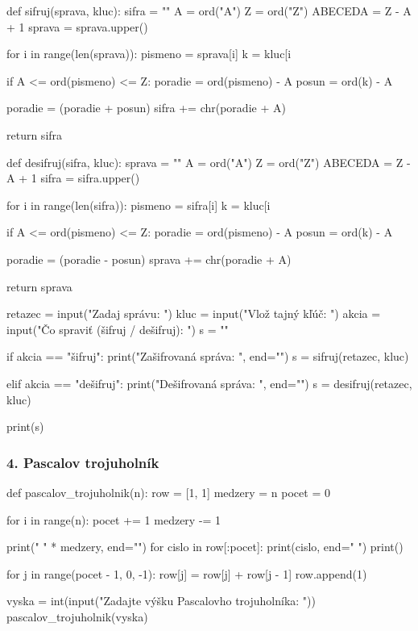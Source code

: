 \begin{solution}
def sifruj(sprava, kluc):
    sifra = ""
    A = ord("A")
    Z = ord("Z")
    ABECEDA = Z - A + 1
    sprava = sprava.upper()

    for i in range(len(sprava)):
        pismeno = sprava[i]
        k = kluc[i %

        if A <= ord(pismeno) <= Z:
            poradie = ord(pismeno) - A
            posun = ord(k) - A

            poradie = (poradie + posun) %
            sifra += chr(poradie + A)

    return sifra


def desifruj(sifra, kluc):
    sprava = ""
    A = ord("A")
    Z = ord("Z")
    ABECEDA = Z - A + 1
    sifra = sifra.upper()

    for i in range(len(sifra)):
        pismeno = sifra[i]
        k = kluc[i %

        if A <= ord(pismeno) <= Z:
            poradie = ord(pismeno) - A
            posun = ord(k) - A

            poradie = (poradie - posun) %
            sprava += chr(poradie + A)

    return sprava


retazec = input("Zadaj správu: ")
kluc = input("Vlož tajný kľúč: ")
akcia = input("Čo spraviť (šifruj / dešifruj): ")
s = ""

if akcia == "šifruj":
    print("Zašifrovaná správa: ", end="")
    s = sifruj(retazec, kluc)

elif akcia == "dešifruj":
    print("Dešifrovaná správa: ", end="")
    s = desifruj(retazec, kluc)

print(s)
\end{solution}


\subsubsection*{4. Pascalov trojuholník}

\begin{solution}
def pascalov_trojuholnik(n):
    row = [1, 1]
    medzery = n
    pocet = 0

    for i in range(n):
        pocet += 1
        medzery -= 1

        print(" " * medzery, end="")
        for cislo in row[:pocet]:
            print(cislo, end=" ")
        print()

        for j in range(pocet - 1,  0, -1):
            row[j] = row[j] + row[j - 1]
        row.append(1)


vyska = int(input("Zadajte výšku Pascalovho trojuholníka: "))
pascalov_trojuholnik(vyska)
\end{solution}


